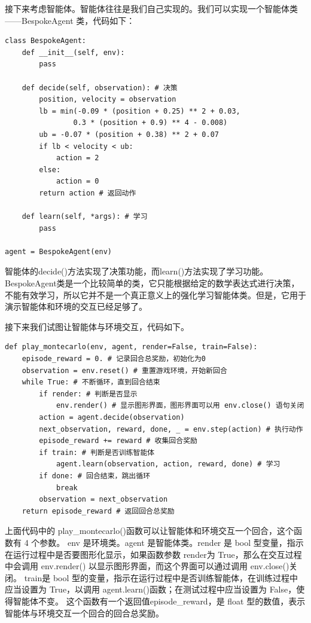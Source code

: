 接下来考虑智能体。智能体往往是我们自己实现的。我们可以实现一个智能体类------BespokeAgent 类，代码如下：

\begin{lstlisting}[style=Python]
class BespokeAgent:
    def __init__(self, env):
        pass
    
    def decide(self, observation): # 决策
        position, velocity = observation
        lb = min(-0.09 * (position + 0.25) ** 2 + 0.03,
                0.3 * (position + 0.9) ** 4 - 0.008)
        ub = -0.07 * (position + 0.38) ** 2 + 0.07
        if lb < velocity < ub:
            action = 2
        else:
            action = 0
        return action # 返回动作

    def learn(self, *args): # 学习
        pass
    
agent = BespokeAgent(env)
\end{lstlisting}

智能体的decide()方法实现了决策功能，而learn()方法实现了学习功能。BespokeAgent类是一个比较简单的类，它只能根据给定的数学表达式进行决策，不能有效学习，所以它并不是一个真正意义上的强化学习智能体类。但是，它用于演示智能体和环境的交互已经足够了。

接下来我们试图让智能体与环境交互，代码如下。

\begin{lstlisting}[style=Python]
def play_montecarlo(env, agent, render=False, train=False):
    episode_reward = 0. # 记录回合总奖励，初始化为0
    observation = env.reset() # 重置游戏环境，开始新回合
    while True: # 不断循环，直到回合结束
        if render: # 判断是否显示
            env.render() # 显示图形界面，图形界面可以用 env.close() 语句关闭
        action = agent.decide(observation)
        next_observation, reward, done, _ = env.step(action) # 执行动作
        episode_reward += reward # 收集回合奖励
        if train: # 判断是否训练智能体
            agent.learn(observation, action, reward, done) # 学习
        if done: # 回合结束，跳出循环
            break
        observation = next_observation
    return episode_reward # 返回回合总奖励
\end{lstlisting}

上面代码中的 play\_montecarlo()函数可以让智能体和环境交互一个回合，这个函数有 4 个参数。
env 是环境类。agent 是智能体类。render 是 bool 型变量，指示在运行过程中是否要图形化显示，如果函数参数 render为 True，那么在交互过程中会调用 env.render() 以显示图形界面，而这个界面可以通过调用 env.close()关闭。
train是 bool 型的变量，指示在运行过程中是否训练智能体，在训练过程中应当设置为 True，以调用 agent.learn()函数；在测试过程中应当设置为 False，使得智能体不变。
这个函数有一个返回值episode\_reward，是 float 型的数值，表示智能体与环境交互一个回合的回合总奖励。

